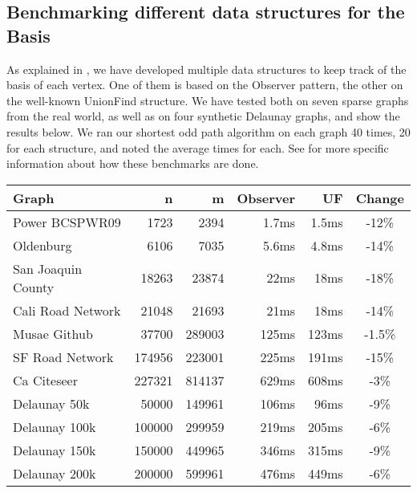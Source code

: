 \subsection{Benchmarking different data structures for the Basis}
\label{subsubsection:testing-basis}
As explained in , we have developed multiple data structures to keep track of the basis of each vertex. One of them is based on the Observer pattern, the other on the well-known UnionFind structure. We have tested both on seven sparse graphs from the real world, as well as on four synthetic Delaunay graphs, and show the results below. We ran our shortest odd path algorithm on each graph 40 times, 20 for each structure, and noted the average times for each. See  for more specific information about how these benchmarks are done.
\begin{center}
    \begin{tabular}{|l | r | r | r | r | c|} 
        \hline
        Graph & n & m & Observer & UF & Change \\ [0.5ex] 
        \hline\hline
        Power BCSPWR09 \cite{graph:bcspwr09-ca-citeseer} & 1723 & 2394 & 1.7ms & 1.5ms & -12\% \\
        \hline
        Oldenburg \cite{graph:oldenburg-sf-cal-san-roads-etc} & 6106 & 7035 & 5.6ms & 4.8ms & -14\%\\ 
        \hline
        San Joaquin County \cite{graph:oldenburg-sf-cal-san-roads-etc} & 18263 & 23874 & 22ms & 18ms & -18\%\\
        \hline
        Cali Road Network \cite{graph:oldenburg-sf-cal-san-roads-etc} & 21048 & 21693 & 21ms & 18ms & -14\%\\
        \hline
        Musae Github \cite{graph:musae-github} & 37700 & 289003 & 125ms & 123ms & -1.5\%\\
        \hline
        SF Road Network \cite{graph:oldenburg-sf-cal-san-roads-etc} & 174956 & 223001 & 225ms & 191ms & -15\%\\
        \hline
        Ca Citeseer \cite{graph:bcspwr09-ca-citeseer} & 227321 & 814137 & 629ms & 608ms & -3\%\\
        \hline
        \hline
        Delaunay 50k & 50000 & 149961 & 106ms & 96ms & -9\%\\
        \hline
        Delaunay 100k & 100000 & 299959 & 219ms & 205ms & -6\%\\
        \hline
        Delaunay 150k & 150000 & 449965 & 346ms & 315ms & -9\%\\
        \hline
        Delaunay 200k & 200000 & 599961 & 476ms & 449ms & -6\%\\
        \hline
    \end{tabular}
\end{center}

